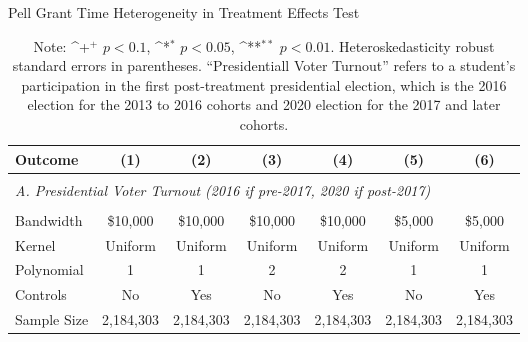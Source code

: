 \documentclass[12pt,letterpaper,oneside]{book}
\newcommand{\basepath}{g:/My Drive/Grad School}
\newcommand{\basepath}{basepath}
\begin{document}
\clearpage

\begin{table}[h!]\centering
    \def\sym#1{\ifmmode^{#1}\else\(^{#1}\)\fi}
    \caption{Pell Grant Time Heterogeneity in Treatment Effects Test\label{tab:pell_ttest}}
    \begin{tabular}{l*{6}{c}}
        \hline\hline
        Outcome&\multicolumn{1}{c}{(1)}&\multicolumn{1}{c}{(2)}&\multicolumn{1}{c}{(3)}&\multicolumn{1}{c}{(4)}&\multicolumn{1}{c}{(5)}&\multicolumn{1}{c}{(6)}\\
        \hline
        &&&&&&\\
        \multicolumn{7}{l}{\textit{A. Presidential Voter Turnout (2016 if  pre-2017, 2020 if  post-2017)}} \\ [0.5em]
         [0.5em]


        &&&&&&\\

        \hline
        Bandwidth & \$10,000       &   \$10,000        &   \$10,000        &   \$10,000       &   \$5,000        &   \$5,000        \\
        Kernel&   Uniform      &   Uniform        &   Uniform        &   Uniform       &   Uniform       &   Uniform       \\
        Polynomial&   1       &   1        &   2        &   2       &   1       &   1       \\
        Controls&   No       &   Yes        &   No        &   Yes        &   No        &   Yes        \\
        Sample Size      &   2,184,303     &     2,184,303      &      2,184,303     &   2,184,303   &    2,184,303      &   2,184,303        \\
        \hline
    \end{tabular}
    \caption*{\footnotesize Note: \sym{+} \(p<0.1\), \sym{*} \(p<0.05\), \sym{**} \(p<0.01\). Heteroskedasticity robust standard errors in parentheses. ``Presidentiall Voter Turnout'' refers to a student's participation in the first post-treatment presidential election, which is the 2016 election for the 2013 to 2016 cohorts and 2020 election for the 2017 and later cohorts.}
\end{table}



\clearpage
\end{document}
